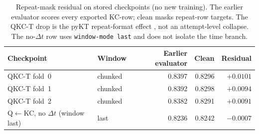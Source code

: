 \begin{table}[H]
\caption{Repeat-mask residual on stored checkpoints (no new training).
The earlier evaluator scores every exported KC-row; clean masks repeat-row
targets. The QKC-T drop is the pyKT repeat-format effect
\cite{liu2022pykt}, not an attempt-level collapse. The no-$\Delta t$
row uses \texttt{window-mode last} and does not isolate the time
branch.}
\label{tab:protocol-residual}
\centering
\footnotesize
\begin{tabular}{@{}llrrr@{}}
\toprule
Checkpoint & Window & Earlier evaluator & Clean & Residual \\
\midrule
QKC-T fold~0 & chunked & 0.8397 & 0.8296 & $+0.0101$ \\
QKC-T fold~1 & chunked & 0.8392 & 0.8298 & $+0.0094$ \\
QKC-T fold~2 & chunked & 0.8382 & 0.8291 & $+0.0091$ \\
Q$\leftarrow$KC, no $\Delta t$ (window last) & last & 0.8236 & 0.8242 & $-0.0007$ \\
\bottomrule
\end{tabular}
\end{table}
